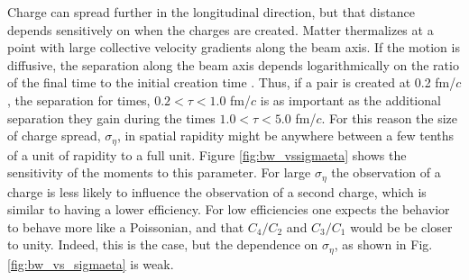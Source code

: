 Charge can spread further in the longitudinal direction, but that distance depends sensitively on when the charges are created. Matter thermalizes at a point with large collective velocity gradients along the beam axis. If the motion is diffusive, the separation along the beam axis depends logarithmically on the ratio of the final time to the initial creation time \cite{Bass:2000az}.  Thus, if a pair is created at 0.2 fm/$c$, the separation for times, $0.2<\tau<1.0$ fm/$c$ is as important as the additional separation they gain during the times $1.0<\tau<5.0$ fm/$c$. For this reason the size of charge spread, $\sigma_\eta$, in spatial rapidity might be anywhere between a few tenths of a unit of rapidity to a full unit. Figure \ref{fig:bw_vssigmaeta} shows the sensitivity of the moments to this parameter. For large $\sigma_\eta$ the observation of a charge is less likely to influence the observation of a second charge, which is similar to having a lower efficiency. For low efficiencies one expects the behavior to behave more like a Poissonian, and that $C_4/C_2$ and $C_3/C_1$ would be be closer to unity. Indeed, this is the case, but the dependence on $\sigma_\eta$, as shown in Fig. \ref{fig:bw_vs_sigmaeta} is weak.
